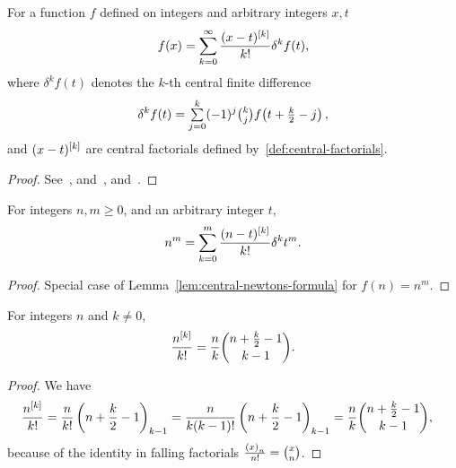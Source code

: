 \begin{lemma}
  For a function $f$ defined on integers and arbitrary integers $x,t$
  \label{lem:central-newtons-formula}
  \begin{align*}
    f(x)
    = \sum_{k=0}^{\infty} \frac{(x-t)^{[k]}}{k!} \delta^{k} f(t),
  \end{align*}
  where $\delta^{k} f(t)$ denotes the $k$-th central finite difference
  \begin{align*}
    \delta^{k} f(t) = \mathop{\textstyle\sum}_{j=0}^{k} (-1)^j \tbinom{k}{j} f\!\left(t+\tfrac{k}{2} - j\right),
  \end{align*}
  and $(x-t)^{[k]}$ are central factorials
  defined by~\eqref{def:central-factorials}.
  \begin{proof}
    See~\cite[p.~462]{butzer1989central}, and~\cite[section 2, eq. (19)]{steffensen1927interpolation},
    and~\cite[section 6, eq. (21)]{riordan1968combinatorial}.
  \end{proof}
\end{lemma}

\begin{lemma}
  \label{lem:central-newtons-formula-for-powers}
  For integers $n,m \geq 0$, and an arbitrary integer $t$,
  \begin{align*}
    n^m = \sum_{k=0}^{m} \frac{(n-t)^{[k]}}{k!} \delta^{k} t^m.
  \end{align*}
  \begin{proof}
    Special case of Lemma~\eqref{lem:central-newtons-formula} for $f(n) = n^m$.
  \end{proof}
\end{lemma}

\begin{lemma}
  \label{lem:central-factorials-binomial-form}
  For integers $n$ and $k\neq0$,
  \begin{align*}
    \frac{n^{[k]}}{k!}
    = \frac{n}{k} \binom{n+\frac{k}{2}-1}{k-1}.
  \end{align*}
  \begin{proof}
    We have
    \begin{align*}
      \frac{n^{[k]}}{k!}
      &= \frac{n}{k!}\left(n+\frac{k}{2}-1\right)_{k-1}
      = \frac{n}{k (k-1)!} \left(n+\frac{k}{2}-1\right)_{k-1}
      = \frac{n}{k} \binom{n+\frac{k}{2}-1}{k-1},
    \end{align*}
    because of the identity in falling factorials
    $\frac{\left(x\right)_{n}}{n!} = \tbinom{x}{n}$.
  \end{proof}
\end{lemma}

